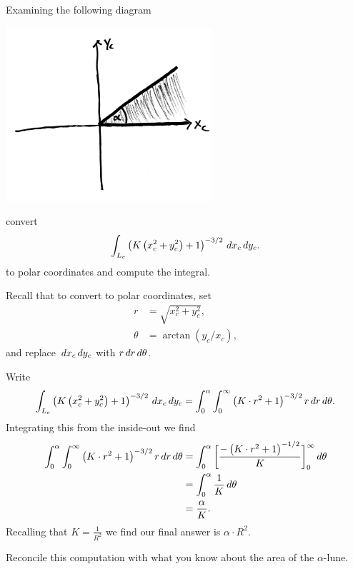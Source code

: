 \documentclass{ximera}
\begin{document}
\begin{problem}
  Examining the following diagram
  \begin{image}
    \includegraphics[width=3in]{halfLune.png}
  \end{image}
  convert
  \[
  \int_{L_c} \left(K\left(x_c^2+y_c^2\right)+1\right)^{-3/2} \,d x_c\,d y_c.
  \]
  to polar coordinates and compute the integral.
  \begin{hint}
    Recall that to convert to polar coordinates, set
    \begin{align*}
      r &= \sqrt{x_c^2+y_c^2},\\
      \theta &= \arctan(y_c/x_c),
    \end{align*}
    and replace $\,d x_c\,d y_c$ with $r\,d r\,d \theta$.
  \end{hint}
  \begin{freeResponse}
    Write
    \[
    \int_{L_c}
    \left(K\left(x_c^2+y_c^2\right)+1\right)^{-3/2} \,d x_c\,d
    y_c = \int_0^\alpha \int_0^\infty \left(K\cdot r^2+1\right)^{-3/2} r\,d r \,d \theta.
    \]
    Integrating this from the inside-out we find
    \begin{align*}
      \int_0^\alpha \int_0^\infty \left(K\cdot r^2+1\right)^{-3/2} r\,d r \,d \theta
      &= \int_0^\alpha \bigg[ \frac{-\left(K\cdot r^2+1\right)^{-1/2}}{K} \bigg]_0^\infty \,d \theta\\
      &= \int_0^\alpha \frac{1}{K} \,d \theta\\
      &= \frac{\alpha}{K}.   
    \end{align*}
    Recalling that $K = \frac{1}{R^2}$ we find our final answer is $\alpha \cdot R^2$.
  \end{freeResponse}
\end{problem}

\begin{problem}
  Reconcile this computation with what you know about the area of the
  $\alpha$-lune.
\end{problem}
\end{document}
